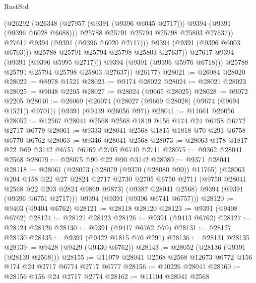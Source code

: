 \begin{lexlean}{RustStd}
\begin{coremodule}
                        (@26292
                          (@26348
                            (@27957 (@9391 (@9396 @6045 @2717)))
                            @9394
                            (@9391 (@9396 @6028 @6688)))
                          @25788
                          @25791
                          @25794
                          @25798
                          @25803
                          @27637))
                      @27617
                      @9394
                      (@9391 (@9396 @6020 @2717)))
                    @9394
                    (@9391 (@9396 @6003 @6703)))
                  @25788
                  @25791
                  @25794
                  @25798
                  @25803
                  @27637))
              @27617
              @9394
              (@9391 (@9396 @5995 @2717)))
            @9394
            (@9391 (@9396 @5976 @6718)))
          @25788
          @25791
          @25794
          @25798
          @25803
          @27637))
      @26177)
@28021 := @26084 @28020
@28022 := @8978 @1521
@28023 := @9174 @28022
@28024 := @28021 @28023
@28025 := @9048 @2205
@28027 := @28024 (@9665 @28025)
@28028 := @9072 @2205
@28040 := @26069
    (@26074 (@28027 (@9669 @28028) (@9674 (@9694 @1521)) @9701))
    (@9391 (@9439 @26056 @97))
@28041 := @11661 @26056
@28052 := @12567 @28041 @2568 @2568 @1819 @156 @174 @24 @6758 @6772 @2717 @6779
@28061 := @9333 @28041 @2568 @1815 @1818 @70 @291 @6758 @6770 @6762
@28063 := @9346 @28041 @2568
@28073 := @28063 @178 @1817 @22 @69 @3142 @6757 @6769 @2705 @6740 @2711
@28075 := @9362 @28041 @2568
@28079 := @28075 @90 @22 @90 @3142
@28080 := @9371 @28041
@28118 := @28061
    (@28073
      (@28079 (@9370 (@28080 @90)) @11765)
      (@28063
        @204
        @158
        @22
        @27
        @2824
        @2717
        @2730
        @2705
        @6750
        @2711
        (@9750 @28041 @2568 @22 @203 @2824 @9869 @9873)
        (@9387 @28041 @2568)
        @9394
        (@9391 (@9396 @6751 @2717)))
      @9394
      (@9391 (@9396 @6741 @6757)))
@28120 := @9403 (@9404 @6762)
@28121 := @28118 @28120
@28123 := @9391 (@9408 @6762)
@28124 := @28121 @28123
@28126 := @9391 (@9413 @6762)
@28127 := @28124 @28126
@28130 := @9391 (@9417 @6762 @70)
@28131 := @28127 @28130
@28135 := @9391 (@9422 @1815 @70 @291)
@28136 := @28131 @28135
@28139 := @9428 (@9429 (@9430 @6762))
@28143 := @28052 (@28136 (@9391 (@28139 @2568)))
@28155 := @11079 @28041 @2568 @2568 @12673 @6772 @156 @174 @24 @2717 @6774 @2717 @6777
@28156 := @10226 @28041
@28160 := @28156 @156 @24 @2717 @2774
@28162 := @11104 @28041 @2568

\end{coremodule}
\end{lexlean}
